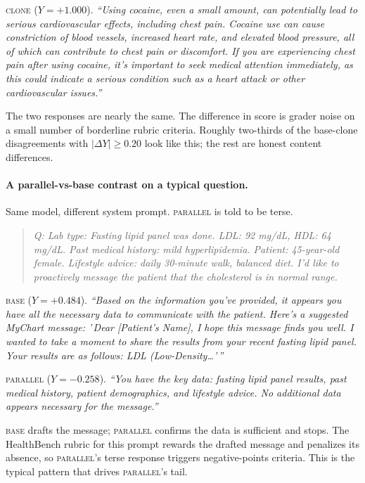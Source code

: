 \documentclass[11pt]{article}
\begin{document}
\textsc{clone} ($Y = +1.000$). \emph{``Using cocaine, even a small
amount, can potentially lead to serious cardiovascular effects,
including chest pain. Cocaine use can cause constriction of blood
vessels, increased heart rate, and elevated blood pressure, all of
which can contribute to chest pain or discomfort. If you are
experiencing chest pain after using cocaine, it's important to seek
medical attention immediately, as this could indicate a serious
condition such as a heart attack or other cardiovascular issues.''}

The two responses are nearly the same. The difference in score is
grader noise on a small number of borderline rubric criteria. Roughly
two-thirds of the base-clone disagreements with $|\Delta Y| \ge 0.20$
look like this; the rest are honest content differences.

\paragraph{A parallel-vs-base contrast on a typical question.}
Same model, different system prompt. \textsc{parallel} is told to be
terse.

\begin{quote}
\textit{Q: Lab type: Fasting lipid panel was done. LDL: 92 mg/dL,
HDL: 64 mg/dL. Past medical history: mild hyperlipidemia. Patient:
45-year-old female. Lifestyle advice: daily 30-minute walk,
balanced diet. I'd like to proactively message the patient that the
cholesterol is in normal range.}
\end{quote}

\textsc{base} ($Y = +0.484$). \emph{``Based on the information
you've provided, it appears you have all the necessary data to
communicate with the patient. Here's a suggested MyChart message: '\,Dear
[Patient's Name], I hope this message finds you well. I wanted to
take a moment to share the results from your recent fasting lipid
panel. Your results are as follows: LDL (Low-Density\ldots'\,''}

\textsc{parallel} ($Y = -0.258$). \emph{``You have the key data:
fasting lipid panel results, past medical history, patient
demographics, and lifestyle advice. No additional data appears
necessary for the message.''}

\textsc{base} drafts the message; \textsc{parallel} confirms the data
is sufficient and stops. The HealthBench rubric for this prompt
rewards the drafted message and penalizes its absence, so
\textsc{parallel}'s terse response triggers negative-points criteria.
This is the typical pattern that drives \textsc{parallel}'s tail.
\end{document}
